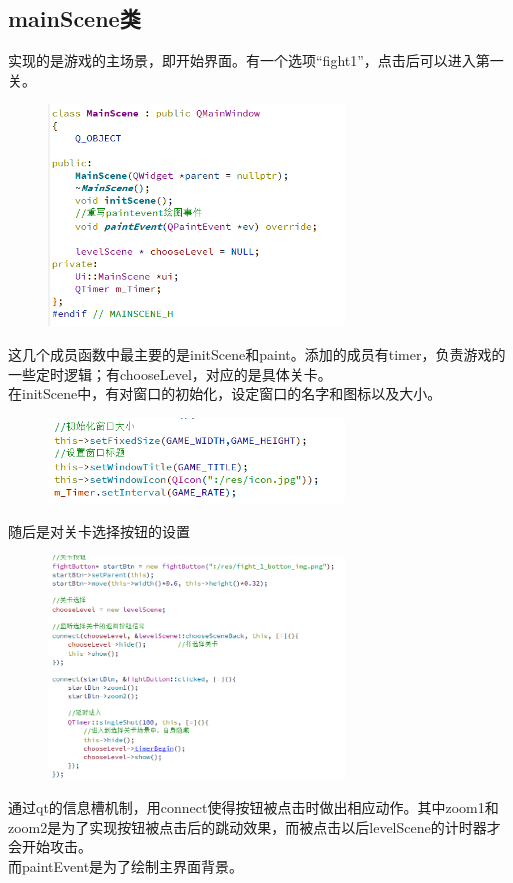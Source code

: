\documentclass[12pt,a4paper,UTF8]{article}
\begin{document}
    \subsection{mainScene类}
    实现的是游戏的主场景，即开始界面。有一个选项“fight1”，点击后可以进入第一关。
    \begin{figure}[H]
      \centering
    \includegraphics[width=0.7\textwidth]{figure/mainScene.png}
    \end{figure}
    这几个成员函数中最主要的是initScene和paint。添加的成员有timer，负责游戏的一些定时逻辑；有chooseLevel，对应的是具体关卡。\\
      在initScene中，有对窗口的初始化，设定窗口的名字和图标以及大小。
      \begin{figure}[H]
        \centering
      \includegraphics[width=0.7\textwidth]{figure/window.png}
      \end{figure}
      随后是对关卡选择按钮的设置
      \begin{figure}[H]
        \centering
      \includegraphics[width=0.7\textwidth]{figure/fightButton.png}
      \end{figure}
      通过qt的信息槽机制，用connect使得按钮被点击时做出相应动作。其中zoom1和zoom2是为了实现按钮被点击后的跳动效果，而被点击以后levelScene的计时器才会开始攻击。\\
      而paintEvent是为了绘制主界面背景。
\end{document}
